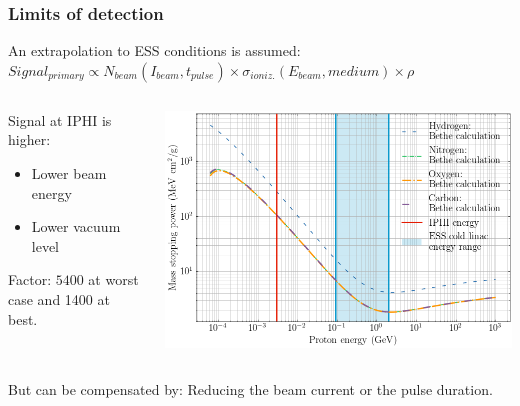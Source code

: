 \begin{frame}[t]
  \frametitle{Limits of detection}
  \begin{block}{An extrapolation to ESS conditions is assumed:}
    $Signal_{primary} \propto N_{beam}(I_{beam},t_{pulse}) \times \sigma_{ioniz.}(E_{beam},medium) \times \rho$
  \end{block}
  \begin{columns}[T]
    \begin{column}{0.35\textwidth}
      \begin{block}{Signal at IPHI is higher:}
        \begin{itemize}
          \item Lower beam energy
          \item Lower vacuum level
        \end{itemize}
        Factor: $5400$ at worst case and 1400 at best.
      \end{block}
    \end{column}
    \begin{column}{0.55\textwidth}
      \centering
      \includegraphics[width=1\textwidth]{04_Test/fig/fig000_Bethe_IPHI}
    \end{column}
  \end{columns}


  \begin{alertblock}{But can be compensated by:}
    Reducing the beam current or the pulse duration.
  \end{alertblock}
\end{frame}

